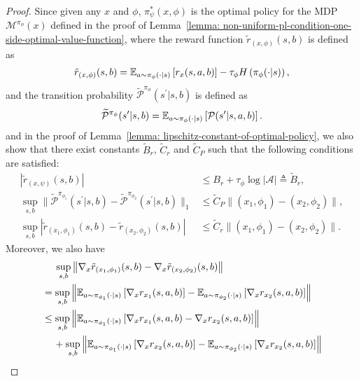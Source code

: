 \documentclass{article}
\theoremstyle{plain}
\theoremstyle{definition}
\theoremstyle{remark}
\def\E{\mathbb E}
\def\cA{\mathcal A}
\def\cM{\mathcal M}
\def\cP{\mathcal P}
\def\bydef{\triangleq}
\begin{document}
\begin{proof}
    Since given any $x$ and $\phi$, $\pi_\psi^*(x,\phi)$ is the optimal policy for the MDP $\cM^{\pi_\phi}(x)$ defined in the proof of Lemma~\ref{lemma: non-uniform-pl-condition-one-side-optimal-value-function}, where the reward function $\tilde{r}_{(x,\phi)}(s,b)$ is defined as 
    \begin{align}
        \tilde{r}_{(x,\phi)}(s,b) = \E_{a \sim \pi_\phi(\cdot|s)} \left[ r_x(s,a,b)\right] - \tau_\phi  H\left(\pi_\phi(\cdot|s) \right),\notag
    \end{align}
    and the transition probability $\widetilde{\cP}^{\pi_\phi}(s^\prime|s,b)$ is defined as
    \begin{align}
        \widetilde{\cP}^{\pi_\phi}(s^\prime|s,b) = \E_{a \sim \pi_\phi(\cdot|s)} \left[ \cP(s^\prime|s,a,b) \right] .\notag
    \end{align}
    and in the proof of Lemma~\ref{lemma: lipschitz-constant-of-optimal-policy}, we also show that there exist constants $\tilde{B}_r$, $\tilde{C}_r$ and $\tilde{C}_P$ such that the following conditions are satisfied:
    \begin{align}
        |\tilde{r}_{(x,\psi)}(s,b)| & \leq B_r + \tau_\phi \log |\cA| \bydef \tilde{B}_r , \\
        \sup_{s,b} \| \widetilde{\cP}^{\pi_{\phi_1}}(s^\prime|s,b) - \widetilde{\cP}^{\pi_{\phi_2}}(s^\prime|s,b) \|_1& \leq \tilde{C}_P \| (x_1,\phi_1) - (x_2,\phi_2) \| , \\
        \sup_{s,b} | \tilde{r}_{(x_1,\phi_1)}(s,b) - \tilde{r}_{(x_2,\phi_2)}(s,b) | & \leq \tilde{C}_r \| (x_1,\phi_1) - (x_2,\phi_2) \| .
    \end{align}
    Moreover, we also have
    \begin{align}
        & \quad\; \sup_{s,b} \left\| \nabla_{x} \tilde{r}_{(x_1,\phi_1)}(s,b) -\nabla_{x} \tilde{r}_{(x_2,\phi_2)}(s,b) \right\|\notag  \\
        & = \sup_{s,b}\left\| \E_{a \sim \pi_{\phi_1}(\cdot|s)} \left[ \nabla_x r_{x_1}(s,a,b) \right] - \E_{a \sim \pi_{\phi_2}(\cdot|s)} \left[ \nabla_x r_{x_2}(s,a,b) \right] \right\| \notag\\
        & \leq \sup_{s,b} \left\| \E_{a \sim \pi_{\phi_1}(\cdot|s)} \left[ \nabla_x r_{x_1}(s,a,b) - \nabla_x r_{x_2}(s,a,b) \right] \right\| \notag \\
        & \quad \, + \sup_{s,b} \left\| \E_{a \sim \pi_{\phi_1}(\cdot|s)} \left[ \nabla_x r_{x_2}(s,a,b) \right] - \E_{a \sim \pi_{\phi_2}(\cdot|s)} \left[ \nabla_x r_{x_2}(s,a,b) \right] \right\| \notag\\

\end{align}
\end{proof}
\end{document}
